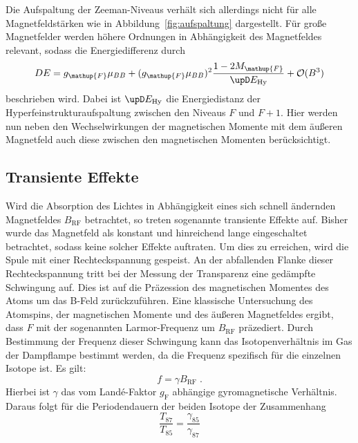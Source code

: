 Die Aufspaltung der Zeeman-Niveaus verhält sich allerdings nicht für alle Magnetfeldstärken wie in Abbildung~\ref{fig:aufspaltung} dargestellt. Für große Magnetfelder werden höhere Ordnungen in Abhängigkeit des Magnetfeldes relevant, sodass die Energiedifferenz durch
%
\begin{equation}
     D E = g_{\mathup{F}}\mu_{BB} + (g_{\mathup{F}}\mu_{BB})^2\frac{1-2M_{\mathup{F}}}{\upD E_{\text{Hy}}} + \mathcal{O}(B^3)
  \label{eq:quad_zeeman}
\end{equation}
%
beschrieben wird. Dabei ist $\upD E_{\text{Hy}}$ die Energiedistanz der Hyperfeinstrukturaufspaltung zwischen den Niveaus $F$ und $F+1$. Hier werden nun neben den Wechselwirkungen der magnetischen Momente mit dem äußeren Magnetfeld auch diese zwischen den magnetischen Momenten berücksichtigt.

\subsection{Transiente Effekte}

Wird die Absorption des Lichtes in Abhängigkeit eines sich
schnell ändernden Magnetfeldes $B_{\text{RF}}$ betrachtet, so treten sogenannte
transiente Effekte auf. Bisher wurde das Magnetfeld als konstant und hinreichend
lange eingeschaltet betrachtet, sodass keine solcher Effekte auftraten. Um dies
zu erreichen, wird die Spule mit einer Rechteckspannung gespeist. An der
abfallenden Flanke dieser Rechteckspannung tritt bei der Messung der Transparenz
eine gedämpfte Schwingung auf. Dies ist auf die Präzession des magnetischen
Momentes des Atoms um das B-Feld zurückzuführen. Eine klassische Untersuchung
des Atomspins, der magnetischen Momente und des äußeren Magnetfeldes ergibt,
dass $F$ mit der sogenannten Larmor-Frequenz um $B_{\text{RF}}$ präzediert. Durch
Bestimmung der Frequenz dieser Schwingung kann das Isotopenverhältnis im Gas der
Dampflampe bestimmt werden, da die Frequenz spezifisch für die einzelnen Isotope
ist. Es gilt:
%
\begin{equation}
    f=\gamma B_{\text{RF}} \; .
\end{equation}
%
Hierbei ist $\gamma$ das vom Landé-Faktor $g_\text{F}$ abhängige gyromagnetische
Verhältnis. Daraus folgt für die Periodendauern der beiden Isotope der
Zusammenhang
%
\begin{equation}
  \frac{T_{87}}{T_{85}}=\frac{\gamma_{85}}{\gamma_{87}}
\end{equation}